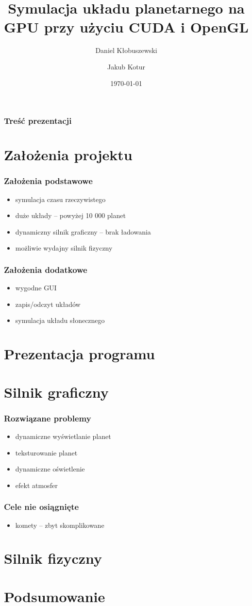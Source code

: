 \documentclass{beamer}
\title{Symulacja układu planetarnego na GPU przy użyciu CUDA i OpenGL}
\author{Daniel Kłobuszewski\and Jakub Kotur}
\institute{{\normalsize Promotor: Krzysztof Kaczmarski}\\\vspace{1cm} Politechnika Warszawska}
\date{\today}
\begin{document}
\frame{\titlepage}

\frame
{
	\frametitle{Treść prezentacji}
	\tableofcontents
}

\section{Założenia projektu}\label{sec:zalozenia}

\frame
{
	\frametitle{Założenia podstawowe}
	\begin{itemize}
	\item symulacja czasu rzeczywistego
	\item duże układy -- powyżej 10 000 planet
	\item dynamiczny silnik graficzny -- brak ładowania
	\item możliwie wydajny silnik fizyczny
	\end{itemize}
}

\frame
{
	\frametitle{Założenia dodatkowe}
	\begin{itemize}
	\item wygodne GUI
	\item zapis/odczyt układów
	\item symulacja układu słonecznego
	\end{itemize}
}
	

\section{Prezentacja programu}\label{sec:prezentacja programu}


\section{Silnik graficzny}\label{sec:silnik graficzny}

\frame
{
	\frametitle{Rozwiązane problemy}
	\begin{itemize}
	\item dynamiczne wyświetlanie planet
	\item teksturowanie planet
	\item dynamiczne oświetlenie
	\item efekt atmosfer
	\end{itemize}
}

\frame
{
	\frametitle{Cele nie osiągnięte}
	\begin{itemize}
	\item komety -- zbyt skomplikowane
	\end{itemize}
}

\section{Silnik fizyczny}\label{sec:silnik fizyczny}

\frame {}

\section{Podsumowanie}\label{sec:podsumowanie}
\end{document}

